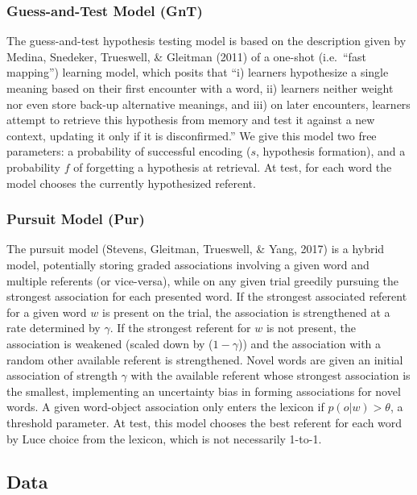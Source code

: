 \documentclass[10pt, letterpaper]{article}
\begin{document}
\hypertarget{guess-and-test-model-gnt}{%
\subsubsection{Guess-and-Test Model
(GnT)}\label{guess-and-test-model-gnt}}

The guess-and-test hypothesis testing model is based on the description
given by Medina, Snedeker, Trueswell, \& Gleitman (2011) of a one-shot
(i.e.~``fast mapping'') learning model, which posits that ``i) learners
hypothesize a single meaning based on their first encounter with a word,
ii) learners neither weight nor even store back-up alternative meanings,
and iii) on later encounters, learners attempt to retrieve this
hypothesis from memory and test it against a new context, updating it
only if it is disconfirmed.'' We give this model two free parameters: a
probability of successful encoding (\(s\), hypothesis formation), and a
probability \(f\) of forgetting a hypothesis at retrieval. At test, for
each word the model chooses the currently hypothesized referent.

\hypertarget{pursuit-model-pur}{%
\subsubsection{Pursuit Model (Pur)}\label{pursuit-model-pur}}

The pursuit model (Stevens, Gleitman, Trueswell, \& Yang, 2017) is a
hybrid model, potentially storing graded associations involving a given
word and multiple referents (or vice-versa), while on any given trial
greedily pursuing the strongest association for each presented word. If
the strongest associated referent for a given word \(w\) is present on
the trial, the association is strengthened at a rate determined by
\(\gamma\). If the strongest referent for \(w\) is not present, the
association is weakened (scaled down by (\(1-\gamma\))) and the
association with a random other available referent is strengthened.
Novel words are given an initial association of strength \(\gamma\) with
the available referent whose strongest association is the smallest,
implementing an uncertainty bias in forming associations for novel
words. A given word-object association only enters the lexicon if
\(p(o|w) > \theta\), a threshold parameter. At test, this model chooses
the best referent for each word by Luce choice from the lexicon, which
is not necessarily 1-to-1.

\hypertarget{data}{%
\subsection{Data}\label{data}}
\end{document}
